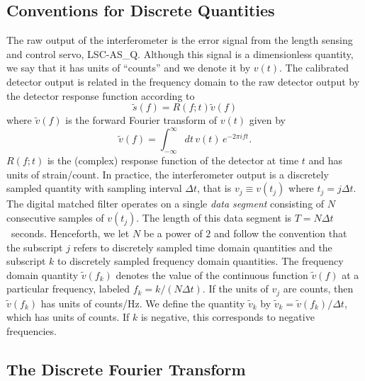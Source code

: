 \subsection{Conventions for Discrete Quantities}
\label{ss:conventions}

The raw output of the interferometer is the error signal from the length
sensing and control servo, LSC-AS\_Q.  Although this signal is a dimensionless
quantity, we say that it has units of ``counts'' and we denote it by $v(t)$.
The calibrated detector output is related in the frequency domain to the raw
detector output by the detector response function according to
\begin{equation}
\tilde{s}(f) = R(f;t) \tilde{v}(f)
\end{equation}
where $\tilde{v}(f)$ is the forward Fourier transform of $v(t)$ given by
\begin{equation}
\tilde{v}(f)=\int_{-\infty}^\infty dt\,v(t)\, e^{- 2 \pi i f t}.
\end{equation}
$R(f;t)$ is the (complex) response function of the detector at time $t$
and has units of strain/count.  In practice, the interferometer output is a
discretely sampled quantity with sampling interval $\Delta t$, that is $v_j
\equiv v(t_j)$ where $t_j = j\Delta t$.  The digital matched filter operates
on a single \emph{data segment} consisting of $N$ consecutive samples of
$v(t_j)$. The length of this data segment is $T = N\Delta t$~seconds.
Henceforth, we let $N$ be a power of $2$ and follow the convention that the
subscript $j$ refers to discretely sampled time domain quantities and the
subscript $k$ to discretely sampled frequency domain quantities.  The
frequency domain quantity $\tilde{v}(f_k)$ denotes the value of the continuous
function $\tilde{v}(f)$ at a particular frequency, labeled $f_k = k/(N\Delta
t)$. If the units of $v_j$ are counts, then $\tilde{v}(f_k)$ has units of
counts/Hz. We define the quantity $\tilde{v}_k$ by $\tilde{v}_k =
\tilde{v}(f_k) / \Delta t$, which has units of counts. If $k$ is negative,
this corresponds to negative frequencies.

\subsection{The Discrete Fourier Transform}
\label{ss:dft}

